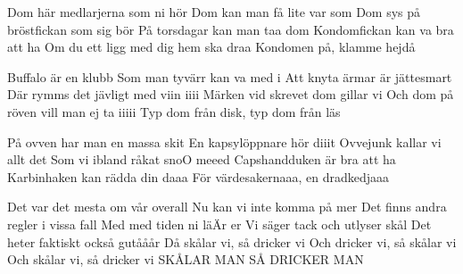 Dom här medlarjerna som ni hör
Dom kan man få lite var som
Dom sys på bröstfickan som sig bör
På torsdagar kan man taa dom
Kondomfickan kan va bra att ha
Om du ett ligg med dig hem ska draa
Kondomen på, klamme hejdå

Buffalo är en klubb
Som man tyvärr kan va med i
Att knyta ärmar är jättesmart
Där rymms det jävligt med viin iiii
Märken vid skrevet dom gillar vi
Och dom på röven vill man ej ta iiiii
Typ dom från disk, typ dom från läs

På ovven har man en massa skit
En kapsylöppnare hör diiit
Ovvejunk kallar vi allt det
Som vi ibland råkat snoO meeed
Capshandduken är bra att ha
Karbinhaken kan rädda din daaa
För värdesakernaaa, en dradkedjaaa

Det var det mesta om vår overall
Nu kan vi inte komma på mer
Det finns andra regler i vissa fall
Med med tiden ni läÄr er
Vi säger tack och utlyser skål
Det heter faktiskt också gutååår
Då skålar vi, så dricker vi
Och dricker vi, så skålar vi
Och skålar vi, så dricker vi
SKÅLAR MAN SÅ DRICKER MAN